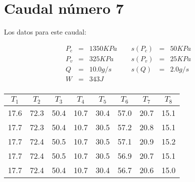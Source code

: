 \documentclass[12pt,a4paper]{article}
\begin{document}
 
\section{Caudal número 7} 
 
Los datos para este caudal:  
 
\begin{equation} 
\begin{array}{lllllll}
P_c & = & 1350 KPa &  \ \ &  s(P_c) & =  & 50  KPa \\ 
 P_v & = & 325 KPa &  \ \ &  s(P_v) & =  & 25  KPa\\ 
 Q & = & 10.0 g/s &  \ \ &  s(Q) & =  & 2.0  g/s \\ 
 W & = & 343 J & & & & \\ 
\end{array} 
\end{equation} 
 
\begin{table}[h!] 	 \centering 
\begin{tabular}{|c|c|c|c|c|c|c|c|} 
\hline 
$T_1$ & $T_2$ & $T_3$ & $T_4$ & $T_5$ & $T_6$ & $T_7$ & $T_8$ \\ \hline 
17.6 & 72.3 & 50.4 & 10.7 & 30.4 & 57.0 & 20.7 & 15.1  \\  
17.7 & 72.3 & 50.4 & 10.7 & 30.5 & 57.2 & 20.8 & 15.1  \\  
17.7 & 72.4 & 50.5 & 10.7 & 30.5 & 57.1 & 20.9 & 15.2  \\  
17.7 & 72.4 & 50.5 & 10.7 & 30.5 & 56.9 & 20.7 & 15.1  \\  
17.7 & 72.4 & 50.4 & 10.7 & 30.4 & 56.7 & 20.6 & 15.0  \\  
\hline 
\end{tabular} 
\label{tab:regresion7} 
\end{table} 
 
 
\end{document}
